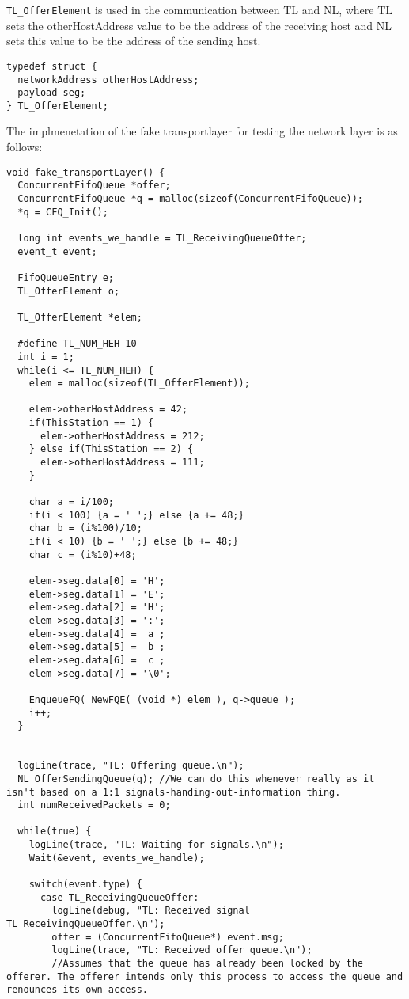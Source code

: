 \texttt{TL\_OfferElement} is used in the communication between TL and NL, where TL sets the otherHostAddress value to be the address of the receiving host and NL sets this value to be the address of the sending host.
\begin{lstlisting}
typedef struct {
  networkAddress otherHostAddress;
  payload seg;
} TL_OfferElement;
\end{lstlisting}
\break

The implmenetation of the fake transportlayer for testing the network layer is as follows:

\begin{lstlisting}
void fake_transportLayer() {
  ConcurrentFifoQueue *offer;
  ConcurrentFifoQueue *q = malloc(sizeof(ConcurrentFifoQueue));
  *q = CFQ_Init();

  long int events_we_handle = TL_ReceivingQueueOffer;
  event_t event;

  FifoQueueEntry e;
  TL_OfferElement o;

  TL_OfferElement *elem;

  #define TL_NUM_HEH 10
  int i = 1;
  while(i <= TL_NUM_HEH) {
    elem = malloc(sizeof(TL_OfferElement));

    elem->otherHostAddress = 42;
    if(ThisStation == 1) {
      elem->otherHostAddress = 212;
    } else if(ThisStation == 2) {
      elem->otherHostAddress = 111;
    }

    char a = i/100;
    if(i < 100) {a = ' ';} else {a += 48;}
    char b = (i%100)/10;
    if(i < 10) {b = ' ';} else {b += 48;}
    char c = (i%10)+48;

    elem->seg.data[0] = 'H';
    elem->seg.data[1] = 'E';
    elem->seg.data[2] = 'H';
    elem->seg.data[3] = ':';
    elem->seg.data[4] =  a ;
    elem->seg.data[5] =  b ;
    elem->seg.data[6] =  c ;
    elem->seg.data[7] = '\0';

    EnqueueFQ( NewFQE( (void *) elem ), q->queue );
    i++;
  }


  logLine(trace, "TL: Offering queue.\n");
  NL_OfferSendingQueue(q); //We can do this whenever really as it isn't based on a 1:1 signals-handing-out-information thing.
  int numReceivedPackets = 0;

  while(true) {
    logLine(trace, "TL: Waiting for signals.\n");
    Wait(&event, events_we_handle);

    switch(event.type) {
      case TL_ReceivingQueueOffer:
        logLine(debug, "TL: Received signal TL_ReceivingQueueOffer.\n");
        offer = (ConcurrentFifoQueue*) event.msg;
        logLine(trace, "TL: Received offer queue.\n");
        //Assumes that the queue has already been locked by the offerer. The offerer intends only this process to access the queue and renounces its own access.


\end{lstlisting}
